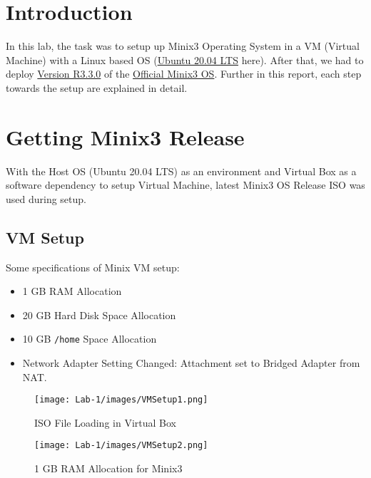 \documentclass[12pt]{article}
\begin{document}
\maketitle

\section{Introduction}
In this lab, the task was to setup up Minix3 Operating System in a VM (Virtual Machine) with a Linux based OS (\href{https://releases.ubuntu.com/20.04/}{Ubuntu 20.04 LTS} here). After that, we had to deploy \href{https://github.com/Stichting-MINIX-Research-Foundation/minix/tree/R3.3.0}{Version R3.3.0} of the \href{https://www.minix3.org}{Official Minix3 OS}. Further in this report, each step towards the setup are explained in detail.


\section{Getting Minix3 Release}

With the Host OS (Ubuntu 20.04 LTS) as an environment and Virtual Box as a software dependency to setup Virtual Machine, latest Minix3 OS Release ISO was used during setup.

\subsection{VM Setup}
Some specifications of Minix VM setup:
\begin{itemize}
    \item 1 GB RAM Allocation
    \item 20 GB Hard Disk Space Allocation
    \item 10 GB \texttt{/home} Space Allocation
    \item Network Adapter Setting Changed: Attachment set to Bridged Adapter from NAT.
\end{itemize}

\begin{figure}
    \centering
    \texttt{[image: Lab-1/images/VMSetup1.png]}
    \caption{ISO File Loading in Virtual Box}
\end{figure}

\begin{figure}
    \centering
    \texttt{[image: Lab-1/images/VMSetup2.png]}
    \caption{1 GB RAM Allocation for Minix3}
\end{figure}
\end{document}
